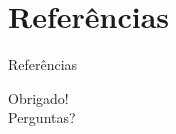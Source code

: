 \documentclass{beamer}
\begin{document}
\section{Referências}

\begin{frame}[allowframebreaks]{Referências}
\footnotesize

\end{frame}


\begin{frame}

   \centering
    \LARGE{Obrigado!} \\
    \vspace{4mm}
    \normalsize{Perguntas?}

\end{frame}






\end{document}
